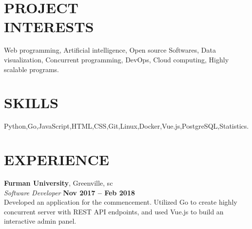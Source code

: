 \documentclass[margin,line]{resume}
\begin{document}
\begin{resume}

\vspace{1mm}

    \section{\mysidestyle \textbf{\large{P}\small{ROJECT\\INTERESTS}}}

    	Web programming, Artificial intelligence, Open source Softwares, Data visualization, Concurrent programming, DevOps, Cloud computing, Highly scalable programs.

\sectionline

    \section{\mysidestyle \textbf{\large{S}\small{KILLS}}}

    Python,\hspace{2mm}Go,\hspace{2mm}JavaScript,\hspace{2mm}HTML,\hspace{2mm}CSS,\hspace{2mm}Git,\hspace{2mm}Linux,\hspace{2mm}Docker,\hspace{2mm}Vue.js,\hspace{2mm}PostgreSQL,\hspace{2mm}Statistics.
    


\sectionline

    \section{\mysidestyle \textbf{\large{E}\small{XPERIENCE}}}

    \textbf{\listing Furman University}, Greenville, sc \vspace{2mm}\\\vspace{1mm}%
    \textsl{Software Developer} \hfill \textbf{Nov 2017 -- Feb 2018}\\
    Developed an application for the commencement. Utilized Go to create highly concurrent server with REST API endpoints, and used Vue.js to build an interactive admin panel. \vspace{1mm}


\end{resume}
\end{document}
